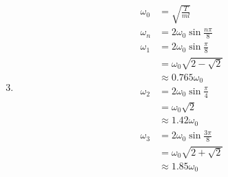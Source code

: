 \documentclass{article}
\begin{document}
\begin{enumerate}
  \setcounter{enumi}{2}
  \item

        \begin{align*}
          \omega_0 & = \sqrt{\frac{T}{m l}}            \\
          \omega_n & = 2 \omega_0 \sin \frac{n \pi}{8} \\
          \omega_1 & = 2 \omega_0 \sin \frac{\pi}{8}   \\
                   & = \omega_0 \sqrt{2 - \sqrt{2}}    \\
                   & \approx 0.765 \omega_0            \\
          \omega_2 & = 2 \omega_0 \sin \frac{\pi}{4}   \\
                   & = \omega_0 \sqrt{2}               \\
                   & \approx 1.42 \omega_0             \\
          \omega_3 & = 2 \omega_0 \sin \frac{3 \pi}{8} \\
                   & = \omega_0 \sqrt{2 + \sqrt{2}}    \\
                   & \approx 1.85 \omega_0
        \end{align*}
\end{enumerate}
\end{document}
